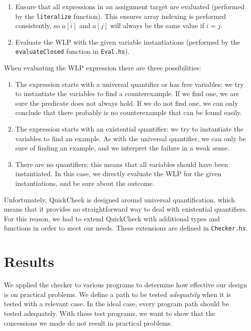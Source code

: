 \documentclass[a4paper]{article}
\begin{document}
\begin{enumerate}
\item Ensure that all expressions in an assignment target are evaluated (performed
by the \texttt{literalize} function). This ensures array indexing is performed
consistently, so $a[i]$ and $a[j]$ will always be the same value if $i = j$.
\item Evaluate the WLP with the given variable instantiations (performed by the
\texttt{evaluateClosed} function in \texttt{Eval.hs}).
\end{enumerate}

When evaluating the WLP expression there are three possibilities:

\begin{enumerate}
\item The expression starts with a universal quantifier or has free variables:
we try to instantiate the variables to find a counterexample. If we find one, we
are sure the predicate does not always hold. If we do not find one, we can only
conclude that there probably is no counterexample that can be found easily.
\item The expression starts with an existential quantifier: we try to instantiate
the variables to find an example. As with the universal quantifier, we can only
be sure of finding an example, and we interpret the failure in a weak sense.
\item There are no quantifiers: this means that all variables should have been
instantiated. In this case, we directly evaluate the WLP for the given
instantiations, and be sure about the outcome.
\end{enumerate}

Unfortunately, QuickCheck is designed around universal quantification, which means
that it provides no straightforward way to deal with existential quantifiers.
For this reason, we had to extend QuickCheck with additional types and functions
in order to meet our needs. These extensions are defined in \texttt{Checker.hs}.

\section{Results}

We applied the checker to various programs to determine how effective our design is on practical problems. We define a path to be tested \emph{adequately} when it is tested with a relevant case. In the ideal case, every program path should be tested adequately. With these test programs, we want to show that the concessions we made do not result in practical problems.
\end{document}
